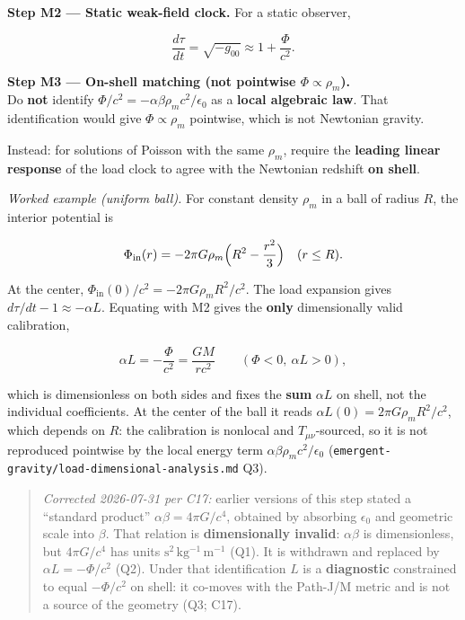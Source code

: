 \documentclass[
  11pt,
]{article}
\begin{document}
\textbf{Step M2 --- Static weak-field clock.} For a static observer,

\[
\frac{d\tau}{dt}
=
\sqrt{-g_{00}}
\approx
1+\frac{\Phi}{c^2}.
\]

\textbf{Step M3 --- On-shell matching (not pointwise
\(\Phi\propto\rho_m\)).}\\
Do \textbf{not} identify \(\Phi/c^2=-\alpha\beta\rho_m c^2/\epsilon_0\)
as a \textbf{local algebraic law}. That identification would give
\(\Phi\propto\rho_m\) pointwise, which is not Newtonian gravity.

Instead: for solutions of Poisson with the same \(\rho_m\), require the
\textbf{leading linear response} of the load clock to agree with the
Newtonian redshift \textbf{on shell}.

\emph{Worked example (uniform ball).} For constant density \(\rho_m\) in
a ball of radius \(R\), the interior potential is

\[
\Phi_{\mathrm{in}}(r)
=
-2\pi G\rho_m\Bigl(R^2-\frac{r^2}{3}\Bigr)
\quad(r\le R).
\]

At the center, \(\Phi_{\mathrm{in}}(0)/c^2=-2\pi G\rho_m R^2/c^2\). The
load expansion gives \(d\tau/dt-1\approx-\alpha L\). Equating with M2
gives the \textbf{only} dimensionally valid calibration,

\[
\alpha L = -\frac{\Phi}{c^2}=\frac{GM}{rc^2}\qquad(\Phi<0,\ \alpha L>0),
\]

which is dimensionless on both sides and fixes the \textbf{sum}
\(\alpha L\) on shell, not the individual coefficients. At the center of
the ball it reads \(\alpha L(0)=2\pi G\rho_m R^2/c^2\), which depends on
\(R\): the calibration is nonlocal and \(T_{\mu\nu}\)-sourced, so it is
not reproduced pointwise by the local energy term
\(\alpha\beta\rho_m c^2/\epsilon_0\)
(\texttt{emergent-gravity/load-dimensional-analysis.md} Q3).

\begin{quote}
\emph{Corrected 2026-07-31 per C17:} earlier versions of this step
stated a ``standard product'' \(\alpha\beta=4\pi G/c^4\), obtained by
absorbing \(\epsilon_0\) and geometric scale into \(\beta\). That
relation is \textbf{dimensionally invalid}: \(\alpha\beta\) is
dimensionless, but \(4\pi G/c^4\) has units
\(\mathrm{s^2\,kg^{-1}\,m^{-1}}\) (Q1). It is withdrawn and replaced by
\(\alpha L=-\Phi/c^2\) (Q2). Under that identification \(L\) is a
\textbf{diagnostic} constrained to equal \(-\Phi/c^2\) on shell: it
co-moves with the Path-J/M metric and is not a source of the geometry
(Q3; C17).
\end{quote}
\end{document}
